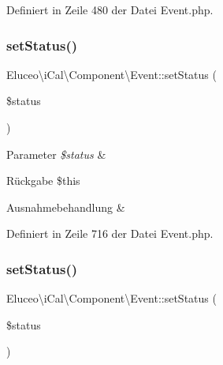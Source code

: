 Definiert in Zeile 480 der Datei Event.\+php.

\mbox{\label{class_eluceo_1_1i_cal_1_1_component_1_1_event_a52ea8343945673a010bd114d50399702}} 
\subsubsection{\texorpdfstring{set\+Status()}{setStatus()}\hspace{0.1cm}{\footnotesize\ttfamily [1/3]}}
{\footnotesize\ttfamily Eluceo\textbackslash{}i\+Cal\textbackslash{}\+Component\textbackslash{}\+Event\+::set\+Status (\begin{DoxyParamCaption}\item[{}]{\$status }\end{DoxyParamCaption})}


\begin{DoxyParams}{Parameter}
{\em \$status} & \\
\hline
\end{DoxyParams}
\begin{DoxyReturn}{Rückgabe}
\$this
\end{DoxyReturn}

\begin{DoxyExceptions}{Ausnahmebehandlung}
{\em } & \\
\hline
\end{DoxyExceptions}


Definiert in Zeile 716 der Datei Event.\+php.

\mbox{\label{class_eluceo_1_1i_cal_1_1_component_1_1_event_a52ea8343945673a010bd114d50399702}} 
\subsubsection{\texorpdfstring{set\+Status()}{setStatus()}\hspace{0.1cm}{\footnotesize\ttfamily [2/3]}}
{\footnotesize\ttfamily Eluceo\textbackslash{}i\+Cal\textbackslash{}\+Component\textbackslash{}\+Event\+::set\+Status (\begin{DoxyParamCaption}\item[{}]{\$status }\end{DoxyParamCaption})}


